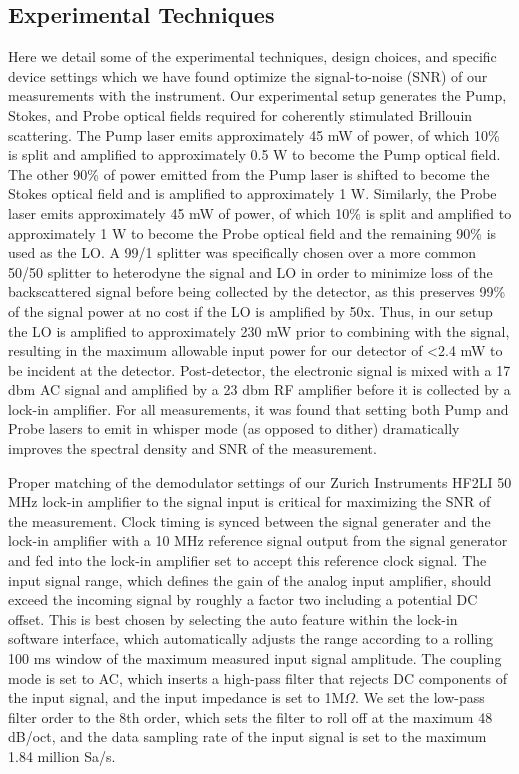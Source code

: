 \documentclass[%
  reprint,
  superscriptaddress,
  amsmath,amssymb,
  aps,
  prapplied,
]{revtex4-2}
\begin{document}
\subsection*{Experimental Techniques}
\label{Methods:Experimental Techniques}
Here we detail some of the experimental techniques, design choices, and specific device settings which we have found optimize the signal-to-noise (SNR) of our measurements with the instrument. Our experimental setup generates the Pump, Stokes, and Probe optical fields required for coherently stimulated Brillouin scattering. The Pump laser emits approximately 45 mW of power, of which 10\% is split and amplified to approximately 0.5 W to become the Pump optical field. The other 90\% of power emitted from the Pump laser is shifted to become the Stokes optical field and is amplified to approximately 1 W. Similarly, the Probe laser emits approximately 45 mW of power, of which 10\% is split and amplified to approximately 1 W to become the Probe optical field and the remaining 90\% is used as the LO. A 99/1 splitter was specifically chosen over a more common 50/50 splitter to heterodyne the signal and LO in order to minimize loss of the backscattered signal before being collected by the detector, as this preserves 99\% of the signal power at no cost if the LO is amplified by 50x. Thus, in our setup the LO is amplified to approximately 230 mW prior to combining with the signal, resulting in the maximum allowable input power for our detector of <2.4 mW to be incident at the detector. Post-detector, the electronic signal is mixed with a 17 dbm AC signal and amplified by a 23 dbm RF amplifier before it is collected by a lock-in amplifier. For all measurements, it was found that setting both Pump and Probe lasers to emit in whisper mode (as opposed to dither) dramatically improves the spectral density and SNR of the measurement.

Proper matching of the demodulator settings of our Zurich Instruments HF2LI 50 MHz lock-in amplifier to the signal input is critical for maximizing the SNR of the measurement. Clock timing is synced between the signal generater and the lock-in amplifier with a 10 MHz reference signal output from the signal generator and fed into the lock-in amplifier set to accept this reference clock signal. The input signal range, which defines the gain of the analog input amplifier, should exceed the incoming signal by roughly a factor two including a potential DC offset. This is best chosen by selecting the auto feature within the lock-in software interface, which automatically adjusts the range according to a rolling 100 ms window of the maximum measured input signal amplitude. The coupling mode is set to AC, which inserts a high-pass filter that rejects DC components of the input signal, and the input impedance is set to 1M$\Omega$. We set the low-pass filter order to the 8th order, which sets the filter to roll off at the maximum 48 dB/oct, and the data sampling rate of the input signal is set to the maximum 1.84 million Sa/s.
\end{document}
